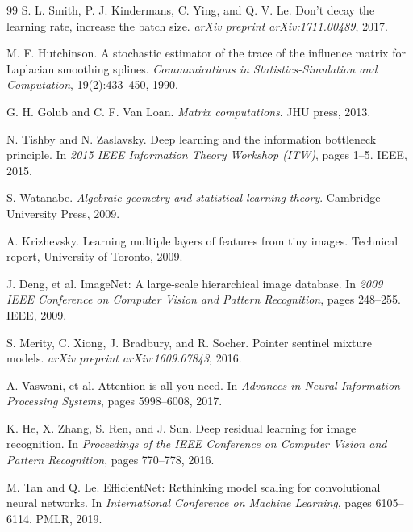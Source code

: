 \documentclass[11pt, a4paper]{article}
\theoremstyle{definition}
\begin{document}
\begin{thebibliography}{99}
S. L. Smith, P. J. Kindermans, C. Ying, and Q. V. Le.
\newblock Don't decay the learning rate, increase the batch size.
\newblock \emph{arXiv preprint arXiv:1711.00489}, 2017.

M. F. Hutchinson.
\newblock A stochastic estimator of the trace of the influence matrix for Laplacian smoothing splines.
\newblock \emph{Communications in Statistics-Simulation and Computation}, 19(2):433--450, 1990.

G. H. Golub and C. F. Van Loan.
\newblock \emph{Matrix computations}.
\newblock JHU press, 2013.

N. Tishby and N. Zaslavsky. 
\newblock Deep learning and the information bottleneck principle.
\newblock In \emph{2015 IEEE Information Theory Workshop (ITW)}, pages 1--5. IEEE, 2015.

S. Watanabe. 
\newblock \emph{Algebraic geometry and statistical learning theory}.
\newblock Cambridge University Press, 2009.

A. Krizhevsky. 
\newblock Learning multiple layers of features from tiny images.
\newblock Technical report, University of Toronto, 2009.

J. Deng, et al.
\newblock ImageNet: A large-scale hierarchical image database. 
\newblock In \emph{2009 IEEE Conference on Computer Vision and Pattern Recognition}, pages 248--255. IEEE, 2009.

S. Merity, C. Xiong, J. Bradbury, and R. Socher. 
\newblock Pointer sentinel mixture models.
\newblock \emph{arXiv preprint arXiv:1609.07843}, 2016.

A. Vaswani, et al.
\newblock Attention is all you need. 
\newblock In \emph{Advances in Neural Information Processing Systems}, pages 5998--6008, 2017.

K. He, X. Zhang, S. Ren, and J. Sun.
\newblock Deep residual learning for image recognition. 
\newblock In \emph{Proceedings of the IEEE Conference on Computer Vision and Pattern Recognition}, pages 770--778, 2016.

M. Tan and Q. Le.
\newblock EfficientNet: Rethinking model scaling for convolutional neural networks. 
\newblock In \emph{International Conference on Machine Learning}, pages 6105--6114. PMLR, 2019.


\end{thebibliography}
\end{document}
